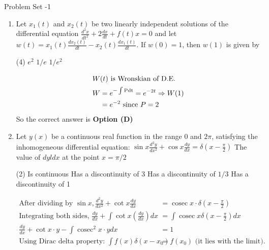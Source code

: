 
\begin{abox}
	Problem Set -1
\end{abox}
\begin{enumerate}[label=\color{ocre}\textbf{\arabic*.}]	
	\item Let $x_{1}(t)$ and $x_{2}(t)$ be two linearly independent solutions of the differential equation $\frac{d^{2} x}{d t^{2}}+2 \frac{d x}{d t}+f(t) x=0$ and let $w(t)=x_{1}(t) \frac{d x_{2}(t)}{d t}-x_{2}(t) \frac{d x_{1}(t)}{d t} .$ If $w(0)=1$, then $w(1)$ is given by
	{}
			\begin{tasks}(4)
			\task[\textbf{B.}] $e^{2}$
			\task[\textbf{C.}]  $1 / e$
			\task[\textbf{D.}] $1 / e^{2}$
		\end{tasks}
			\begin{answer}
			\begin{align*}
			\intertext{$W(t)$ is Wronskian of D.E.}
			W&=e^{-\int \mathrm{Pdt}}=e^{-2 t} \Rightarrow W(1)\\&=e^{-2}\text{ since }P=2
			\end{align*}
			So the correct answer is \textbf{Option (D)}
		\end{answer}
\item Let $y(x)$ be a continuous real function in the range 0 and $2 \pi$, satisfying the inhomogeneous differential equation: $\sin x \frac{d^{2} y}{d x^{2}}+\cos x \frac{d y}{d x}=\delta\left(x-\frac{\pi}{2}\right)$ The value of $d y l d x$ at the point $x=\pi / 2$
{}
\begin{tasks}(2)
	\task[\textbf{A.}] Is continuous
	\task[\textbf{B.}] Has a discontinuity of 3
	\task[\textbf{C.}] Has a discontinuity of $1 / 3$
	\task[\textbf{D.}] Has a discontinuity of 1
\end{tasks}
\begin{answer}
	\begin{align*}
	\text{After dividing by }\sin x, \frac{d^{2} y}{d x^{2}}+\cot x \frac{d y}{d x}&=\operatorname{cosec} x \cdot \delta\left(x-\frac{\pi}{2}\right)\\
	\text{Integrating both sides, }\frac{d y}{d x}+\int \cot x\left(\frac{d y}{d x}\right) d x&=\int \operatorname{cosec} x \delta\left(x-\frac{\pi}{2}\right) d x\\
	\frac{d y}{d x}+\cot x \cdot y-\int \operatorname{cosec}^{2} x \cdot y d x&=1\\
	\text{Using Dirac delta property: }\int f(x) \delta\left(x-x_{0}\right)&=f\left(x_{0}\right)\text{ (it lies with the limit).}\\

\end{align*}
\end{answer}
\end{enumerate}
